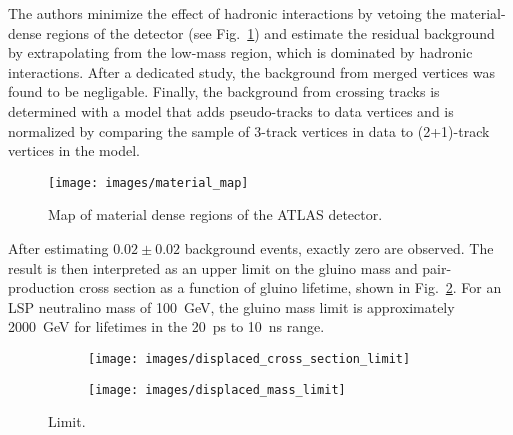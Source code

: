\documentclass[12pt]{article}
\begin{document}
        The authors minimize the effect of hadronic interactions by vetoing the material-dense regions of the detector (see Fig.~\ref{material_map}) and estimate the residual background by extrapolating from the low-mass region, which is dominated by hadronic interactions. After a dedicated study, the background from merged vertices was found to be negligable. Finally, the background from crossing tracks is determined with a model that adds pseudo-tracks to data vertices and is normalized by comparing the sample of 3-track vertices in data to (2+1)-track vertices in the model.

        \noindent \begin{figure}[htbp] \begin{center}
        \texttt{[image: images/material\_map]}
        \caption{Map of material dense regions of the ATLAS detector.}
        \label{material_map}
        \end{center} \end{figure}

        After estimating $\num{0.02} \pm \num{0.02}$ background events, exactly zero are observed. The result is then interpreted as an upper limit on the gluino mass and pair-production cross section as a function of gluino lifetime, shown in Fig.~\ref{displaced_limit}. For an LSP neutralino mass of \SI{100}{\giga\electronvolt}, the gluino mass limit is approximately \SI{2000}{\giga\electronvolt} for lifetimes in the \SI{20}{\pico\s} to \SI{10}{\nano\s} range.

        \noindent \begin{figure}[htbp] \begin{center}
        \begin{subfigure}[htbp]{0.45\textwidth} \begin{center}
        \texttt{[image: images/displaced\_cross\_section\_limit]}
        \end{center} \end{subfigure}
        \begin{subfigure}[htbp]{0.45\textwidth} \begin{center}
        \texttt{[image: images/displaced\_mass\_limit]}
        \end{center} \end{subfigure}
        \caption{Limit.}
        \label{displaced_limit}
        \end{center} \end{figure}
\end{document}
